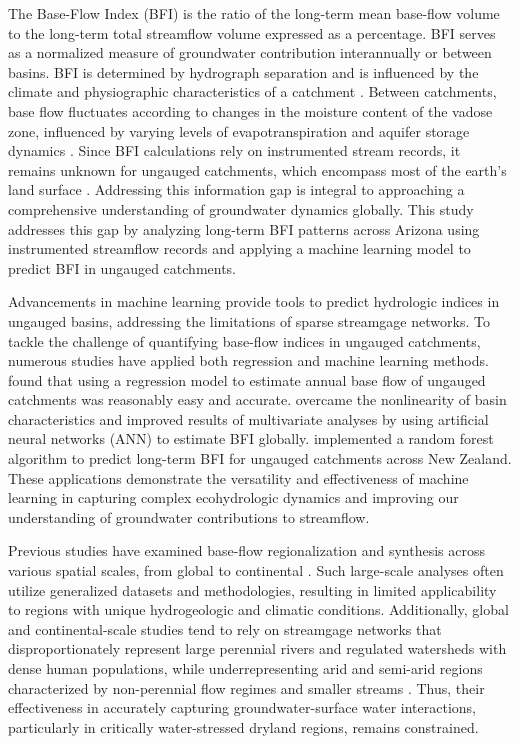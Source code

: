 \documentclass[
  authoryear,
  preprint,
  1p,
  onecolumn]{elsarticle}
\begin{document}
The Base-Flow Index (BFI) is the ratio of the long-term mean base-flow
volume to the long-term total streamflow volume expressed as a
percentage. BFI serves as a normalized measure of groundwater
contribution interannually or between basins. BFI is determined by
hydrograph separation and is influenced by the climate and physiographic
characteristics of a catchment \citep{neff2005, beck2013, singh2018}.
Between catchments, base flow fluctuates according to changes in the
moisture content of the vadose zone, influenced by varying levels of
evapotranspiration and aquifer storage dynamics \citep{bosch2017}. Since
BFI calculations rely on instrumented stream records, it remains unknown
for ungauged catchments, which encompass most of the earth's land
surface \citep{fekete2007}. Addressing this information gap is integral
to approaching a comprehensive understanding of groundwater dynamics
globally. This study addresses this gap by analyzing long-term BFI
patterns across Arizona using instrumented streamflow records and
applying a machine learning model to predict BFI in ungauged catchments.

Advancements in machine learning provide tools to predict hydrologic
indices in ungauged basins, addressing the limitations of sparse
streamgage networks. To tackle the challenge of quantifying base-flow
indices in ungauged catchments, numerous studies have applied both
regression and machine learning methods. \citet{ahiablame2013} found
that using a regression model to estimate annual base flow of ungauged
catchments was reasonably easy and accurate. \citet{beck2013} overcame
the nonlinearity of basin characteristics and improved results of
multivariate analyses by using artificial neural networks (ANN) to
estimate BFI globally. \citet{singh2018} implemented a random forest
algorithm to predict long-term BFI for ungauged catchments across New
Zealand. These applications demonstrate the versatility and
effectiveness of machine learning in capturing complex ecohydrologic
dynamics and improving our understanding of groundwater contributions to
streamflow.

Previous studies have examined base-flow regionalization and synthesis
across various spatial scales, from global to continental
\citep{beck2013, santhi2008, ayers2022, singh2018}. Such large-scale
analyses often utilize generalized datasets and methodologies, resulting
in limited applicability to regions with unique hydrogeologic and
climatic conditions. Additionally, global and continental-scale studies
tend to rely on streamgage networks that disproportionately represent
large perennial rivers and regulated watersheds with dense human
populations, while underrepresenting arid and semi-arid regions
characterized by non-perennial flow regimes and smaller streams
\citep{krabbenhoft-2022}. Thus, their effectiveness in accurately
capturing groundwater-surface water interactions, particularly in
critically water-stressed dryland regions, remains constrained.
\end{document}
